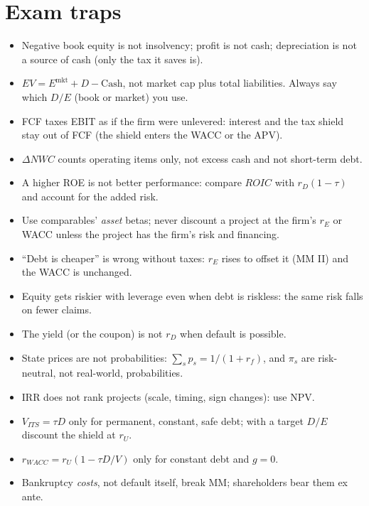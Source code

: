 \documentclass[10pt,a4paper]{article}
\begin{document}
\section*{Exam traps}
\begin{itemize}
\item Negative book equity is not insolvency; profit is not cash; depreciation is not a source of cash
      (only the tax it saves is).
\item $EV=E^{\text{mkt}}+D-\text{Cash}$, not market cap plus total liabilities. Always say which
      $D/E$ (book or market) you use.
\item FCF taxes EBIT as if the firm were unlevered: interest and the tax shield stay out of FCF (the
      shield enters the WACC or the APV).
\item $\Delta NWC$ counts operating items only, not excess cash and not short-term debt.
\item A higher ROE is not better performance: compare $ROIC$ with $r_D(1-\tau)$ and account for the
      added risk.
\item Use comparables' \emph{asset} betas; never discount a project at the firm's $r_E$ or WACC
      unless the project has the firm's risk and financing.
\item ``Debt is cheaper'' is wrong without taxes: $r_E$ rises to offset it (MM II) and the WACC is
      unchanged.
\item Equity gets riskier with leverage even when debt is riskless: the same risk falls on fewer
      claims.
\item The yield (or the coupon) is not $r_D$ when default is possible.
\item State prices are not probabilities: $\sum_s p_s=1/(1+r_f)$, and $\pi_s$ are risk-neutral, not
      real-world, probabilities.
\item IRR does not rank projects (scale, timing, sign changes): use NPV.
\item $V_{ITS}=\tau D$ only for permanent, constant, safe debt; with a target $D/E$ discount the
      shield at $r_U$.
\item $r_{WACC}=r_U(1-\tau D/V)$ only for constant debt and $g=0$.
\item Bankruptcy \emph{costs}, not default itself, break MM; shareholders bear them ex ante.
\end{itemize}
\end{document}
